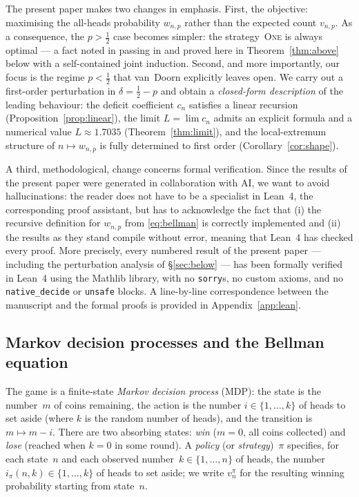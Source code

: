 \documentclass[reqno,final,11pt]{amsart}
\theoremstyle{plain}
\theoremstyle{definition}
\theoremstyle{remark}
\newcommand{\One}{\textsc{One}}
\begin{document}
The present paper makes two changes in emphasis.  First, the
objective: maximising the all-heads probability $w_{n,p}$ rather
than the expected count $v_{n,p}$. As a consequence, the $p>\tfrac12$ case becomes simpler: 
the strategy~\One{} is always optimal --- a fact noted in passing
in \citet[\S 10]{vanDoorn2024} and proved here in
Theorem~\ref{thm:above} below with a self-contained joint
induction. Second, and more importantly, our focus is the regime
$p<\tfrac12$ that van~Doorn explicitly leaves open.  We carry out
a first-order perturbation in $\delta=\tfrac12-p$ and obtain a
\emph{closed-form description} of the leading behaviour: the
deficit coefficient $c_n$ satisfies a linear recursion
(Proposition~\ref{prop:linear}), the limit $L=\lim c_n$ admits an
explicit formula and a numerical value $L\approx
1.7035$ (Theorem~\ref{thm:limit}), and the local-extremum
structure of $n\mapsto w_{n,p}$ is fully determined to first order
(Corollary~\ref{cor:shape}).

A third, methodological, change concerns formal verification.
Since the results of the present paper were generated in collaboration with AI,
we want to avoid hallucinations: the reader does not have to be a specialist in Lean~4, 
the corresponding proof assistant, but has to acknowledge the fact that (i) the recursive definition
for $w_{n,p}$ from \eqref{eq:bellman} is correctly implemented and (ii) the results as they stand 
compile without error, meaning that Lean~4 has checked every proof. 
More precisely, every numbered result
of the present paper --- including the perturbation analysis of
\S\ref{sec:below} --- has been formally verified in Lean~4 using
the Mathlib library, with no \texttt{sorry}s, no custom axioms,
and no \texttt{native\_decide} or \texttt{unsafe} blocks.  A
line-by-line correspondence between the manuscript and the formal
proofs is provided in Appendix~\ref{app:lean}.

\subsection{Markov decision processes and the Bellman equation}

The game is a finite-state \emph{Markov decision process} (MDP): the
state is the number~$m$ of coins remaining, the action is the number
$i\in\{1,\dots,k\}$ of heads to set aside (where $k$ is the random
number of heads), and the transition is
$m\mapsto m-i$.  There are two absorbing states: \emph{win}
($m=0$, all coins collected) and \emph{lose} (reached when $k=0$ in
some round).  A \emph{policy} (or \emph{strategy})~$\pi$ specifies,
for each state~$n$ and each observed number~$k\in\{1,\dots,n\}$ of
heads, the number $i_\pi(n,k)\in\{1,\dots,k\}$ of heads to set
aside; we write $v_n^\pi$ for the resulting winning probability
starting from state~$n$.
\end{document}
